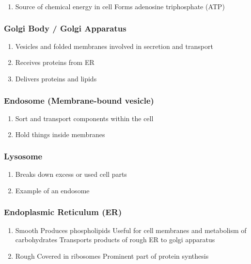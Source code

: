 \documentclass{notes}
\begin{document}
\begin{enumerate}
    \item Source of chemical energy in cell
          \subitem Forms adenosine triphosphate (ATP)
\end{enumerate}

\subsubsection*{Golgi Body / Golgi Apparatus}

\begin{enumerate}
    \item Vesicles and folded membranes involved in secretion and transport
    \item Receives proteins from ER
    \item Delivers proteins and lipids
\end{enumerate}

\subsubsection*{Endosome (Membrane-bound vesicle)}

\begin{enumerate}
    \item Sort and transport components within the cell
    \item Hold things inside membranes
\end{enumerate}

\subsubsection*{Lysosome}

\begin{enumerate}
    \item Breaks down excess or used cell parts
    \item Example of an endosome
\end{enumerate}

\subsubsection*{Endoplasmic Reticulum (ER)}

\begin{enumerate}
    \item Smooth
          \subitem Produces phospholipids
          \subitem Useful for cell membranes and metabolism of carbohydrates
          Transports products of rough ER to golgi apparatus
    \item Rough
          \subitem Covered in ribosomes
          \subitem Prominent part of protein synthesis
\end{enumerate}
\end{document}

